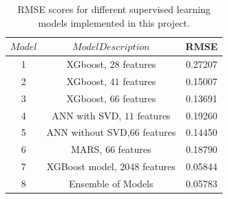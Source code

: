 \documentclass{article}
\begin{document}
\begin{table}[!h]
\begin{center}
\begin{tabular}{ c c c } \toprule
    {$Model$} & {$Model Description$} & {RMSE} \\ \midrule
    1  & {XGboost, $28$ features} &  0.27207  \\
    2  & {XGboost, $41$ features} &  0.15007  \\
    3  & {XGboost, $66$ features} &  0.13691  \\ \midrule
    4  & {ANN with SVD, $11$ features}          & 0.19260  \\
    5  & {ANN without SVD,$66$ features}       & 0.14450  \\
    6  & {MARS, $66$ features}                  & 0.18790  \\ \midrule
		7  & {XGBoost model, 2048 features}         & 0.05844  \\ \midrule
    8  & {Ensemble of Models}                   & 0.05783 \\ \bottomrule
\end{tabular}
\end{center}
\caption{RMSE scores for different supervised learning models implemented in this project.}
\label{tab:RSEscores}
\end{table}
\end{document}
